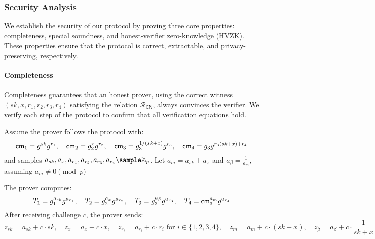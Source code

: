\subsubsection{Security Analysis}
We establish the security of our protocol by proving three core properties: completeness, special soundness, and honest-verifier zero-knowledge (HVZK). These properties ensure that the protocol is correct, extractable, and privacy-preserving, respectively.

\paragraph{Completeness}
Completeness guarantees that an honest prover, using the correct witness $(sk, x, r_1, r_2, r_3, r_4)$ satisfying the relation $\mathcal{R}_{\mathsf{CN}}$, always convinces the verifier. We verify each step of the protocol to confirm that all verification equations hold.

Assume the prover follows the protocol with:
\[
\mathsf{cm}_1 = g_1^{sk} g^{r_1}, \quad \mathsf{cm}_2 = g_2^{x} g^{r_2}, \quad \mathsf{cm}_3 = g_3^{1/(sk + x)} g^{r_3}, \quad \mathsf{cm}_4 = g_3 g^{r_3 (sk + x) + r_4}
\]
and samples $a_{sk}, a_x, a_{r_1}, a_{r_2}, a_{r_3}, a_{r_4} \sample \mathbb{Z}_p$. Let $a_m = a_{sk} + a_x$ and $a_{\beta} = \frac{1}{a_m}$, assuming $a_m \neq 0 \pmod{p}$


The prover computes:
\[
T_1 = g_1^{a_{sk}} g^{a_{r_1}}, \quad T_2 = g_2^{a_x} g^{a_{r_2}}, \quad T_3 = g_3^{a_{\beta}} g^{a_{r_3}}, \quad T_4 = \mathsf{cm}_3^{a_m} g^{a_{r_4}}
\]
After receiving challenge $c$, the prover sends:
\[
z_{sk} = a_{sk} + c \cdot sk, \quad z_x = a_x + c \cdot x, \quad z_{r_i} = a_{r_i} + c \cdot r_i \text{ for } i \in \{1,2,3,4\}, \quad z_m = a_m + c \cdot (sk + x), \quad z_{\beta} = a_{\beta} + c \cdot \frac{1}{sk + x}
\]

